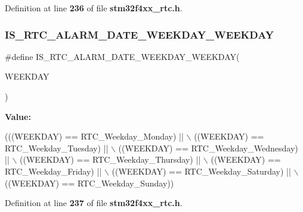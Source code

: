Definition at line \textbf{ 236} of file \textbf{ stm32f4xx\+\_\+rtc.\+h}.

\mbox{\label{group__RTC__Alarm__Definitions_gabc968cd70cf33e06b8e2886c98099021}} 
\subsubsection{I\+S\+\_\+\+R\+T\+C\+\_\+\+A\+L\+A\+R\+M\+\_\+\+D\+A\+T\+E\+\_\+\+W\+E\+E\+K\+D\+A\+Y\+\_\+\+W\+E\+E\+K\+D\+AY}
{\footnotesize\ttfamily \#define I\+S\+\_\+\+R\+T\+C\+\_\+\+A\+L\+A\+R\+M\+\_\+\+D\+A\+T\+E\+\_\+\+W\+E\+E\+K\+D\+A\+Y\+\_\+\+W\+E\+E\+K\+D\+AY(\begin{DoxyParamCaption}\item[{}]{W\+E\+E\+K\+D\+AY }\end{DoxyParamCaption})}

{\bfseries Value\+:}
\begin{DoxyCode}
(((WEEKDAY) == RTC_Weekday_Monday) || \(\backslash\)
                                                    ((WEEKDAY) == 
      RTC_Weekday_Tuesday) || \(\backslash\)
                                                    ((WEEKDAY) == 
      RTC_Weekday_Wednesday) || \(\backslash\)
                                                    ((WEEKDAY) == 
      RTC_Weekday_Thursday) || \(\backslash\)
                                                    ((WEEKDAY) == 
      RTC_Weekday_Friday) || \(\backslash\)
                                                    ((WEEKDAY) == 
      RTC_Weekday_Saturday) || \(\backslash\)
                                                    ((WEEKDAY) == 
      RTC_Weekday_Sunday))
\end{DoxyCode}


Definition at line \textbf{ 237} of file \textbf{ stm32f4xx\+\_\+rtc.\+h}.

